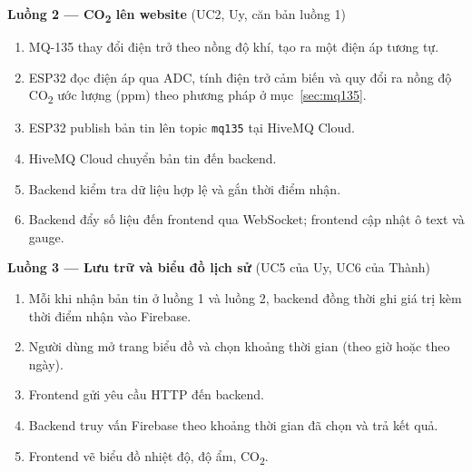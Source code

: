 \documentclass[12pt,a4paper]{article}
\begin{document}
\noindent\begin{minipage}{\linewidth}
\setlength{\parskip}{4pt}
\textbf{Luồng 2 --- CO\textsubscript{2} lên website} (UC2, Uy, căn bản luồng 1)
\begin{enumerate}[leftmargin=2em]
  \item MQ-135 thay đổi điện trở theo nồng độ khí, tạo ra một điện áp tương tự.
  \item ESP32 đọc điện áp qua ADC, tính điện trở cảm biến và quy đổi ra nồng độ CO\textsubscript{2} ước lượng (ppm) theo phương pháp ở mục~\ref{sec:mq135}.
  \item ESP32 publish bản tin lên topic \texttt{mq135} tại HiveMQ Cloud.
  \item HiveMQ Cloud chuyển bản tin đến backend.
  \item Backend kiểm tra dữ liệu hợp lệ và gắn thời điểm nhận.
  \item Backend đẩy số liệu đến frontend qua WebSocket; frontend cập nhật ô text và gauge.
\end{enumerate}
\end{minipage}
\par\medskip

\noindent\begin{minipage}{\linewidth}
\setlength{\parskip}{4pt}
\textbf{Luồng 3 --- Lưu trữ và biểu đồ lịch sử} (UC5 của Uy, UC6 của Thành)
\begin{enumerate}[leftmargin=2em]
  \item Mỗi khi nhận bản tin ở luồng 1 và luồng 2, backend đồng thời ghi giá trị kèm thời điểm nhận vào Firebase.
  \item Người dùng mở trang biểu đồ và chọn khoảng thời gian (theo giờ hoặc theo ngày).
  \item Frontend gửi yêu cầu HTTP đến backend.
  \item Backend truy vấn Firebase theo khoảng thời gian đã chọn và trả kết quả.
  \item Frontend vẽ biểu đồ nhiệt độ, độ ẩm, CO\textsubscript{2}.
\end{enumerate}
\end{minipage}
\par\medskip
\end{document}
